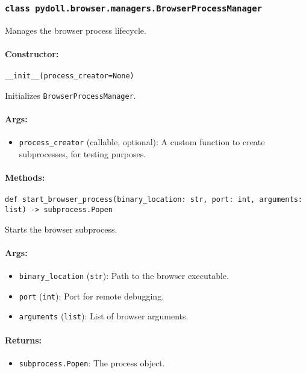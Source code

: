 \documentclass{article}
\begin{document}
\subsubsection*{\texttt{class pydoll.browser.managers.BrowserProcessManager}}
\noindent Manages the browser process lifecycle.

\paragraph{Constructor:}
\noindent\texttt{\_\_init\_\_(process\_creator=None)}

\noindent Initializes \texttt{BrowserProcessManager}.

\paragraph{Args:}
\begin{itemize}
    \item \texttt{process\_creator} (callable, optional): A custom function to create subprocesses, for testing purposes.
\end{itemize}

\paragraph{Methods:}
\noindent\texttt{def start\_browser\_process(binary\_location: str, port: int, arguments: list) -> subprocess.Popen}

\noindent Starts the browser subprocess.

\paragraph{Args:}
\begin{itemize}
    \item \texttt{binary\_location} (\texttt{str}): Path to the browser executable.
    \item \texttt{port} (\texttt{int}): Port for remote debugging.
    \item \texttt{arguments} (\texttt{list}): List of browser arguments.
\end{itemize}

\paragraph{Returns:}
\begin{itemize}
    \item \texttt{subprocess.Popen}: The process object.
\end{itemize}
\end{document}
